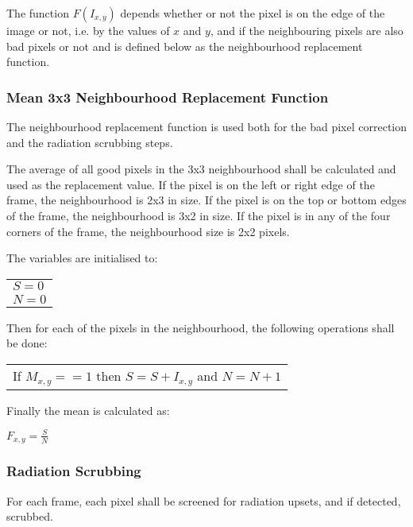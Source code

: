 The function \(F(I_{x,y})\) depends whether or not the pixel is on the edge of the image or not, i.e. by the values of \(x\) and \(y\), and if the neighbouring pixels are also bad pixels or not and is defined below as the neighbourhood replacement function.

\subsubsection{Mean 3x3 Neighbourhood Replacement Function}
The neighbourhood replacement function is used both for the bad pixel correction and the radiation scrubbing steps.

The average of all good pixels in the 3x3 neighbourhood shall be calculated and used as the replacement value. If the pixel is on the left or right edge of the frame, the neighbourhood is 2x3 in size. If the pixel is on the top or bottom edges of the frame, the neighbourhood is 3x2 in size. If the pixel is in any of the four corners of the frame, the neighbourhood size is 2x2 pixels. 

The variables are initialised to: \\

\begin{center}
\begin{tabular}{l}
\(S = 0\)\\
\(N = 0\)\\
\end{tabular}
\end{center}

Then for each of the pixels in the neighbourhood, the following operations shall be done: 

\begin{center}
\begin{tabular}{l}
If \(M_{x,y} == 1\) then \(S = S + I_{x,y}\) and \(N = N + 1\) \\
\end{tabular}
\end{center}

Finally the mean is calculated as: 
\begin{center}
\(F_{x,y} = \frac{S}{N}\)
\end{center}

\subsubsection{Radiation Scrubbing}
For each frame, each pixel shall be screened for radiation upsets, and if detected, scrubbed. 

